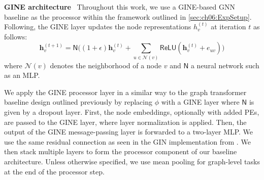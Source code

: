 \textbf{GINE architecture}~
Throughout this work, we use a GINE-based GNN baseline as the processor within the framework outlined in \cref{sec:ch06:ExpSetup}. Following, \citet{HuEtAl20} the GINE layer updates the node representations $h_v^{(t)}$ at iteration $t$ as follows: 
\begin{equation*}
    \boldsymbol{h}_v^{(t+1)} = \mathsf{N}\Big((1+\epsilon) \boldsymbol{h}_v^{(t)} + \sum_{u \in \mathcal{N}(v)}\mathsf{ReLU}(\boldsymbol{h}_v^{(t)} + e_{uv})\Big)
\end{equation*}
where $\mathcal{N}(v)$ denotes the neighborhood of a node $v$ and $\mathsf{N}$ a neural network such as an MLP.  
 
We apply the GINE processor layer in a similar way to the graph transformer baseline design outlined previously by replacing $\phi$ with a GINE layer where $\mathsf{N}$ is given by a dropout layer. 
First, the node embeddings, optionally with added PEs, are passed to the GINE layer, where layer normalization is applied. Then, the output of the GINE message-passing layer is forwarded to a two-layer MLP. We use the same residual connection as seen in the GIN implementation from \citet{BecEtAl25}. 
We then stack multiple layers to form the processor component of our baseline architecture. 
Unless otherwise specified, we use mean pooling for graph-level tasks at the end of the processor step. 

